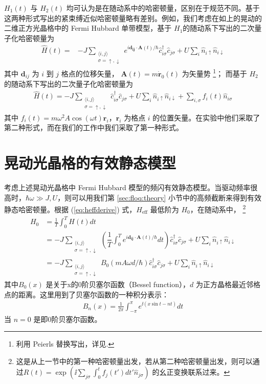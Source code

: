 $H_1(t)$ 与 $H_2(t)$ 均可认为是在随动系中的哈密顿量，区别在于规范不同。基于这两种形式写出的紧束缚近似哈密顿量略有差别。例如，我们考虑在如上的晃动的二维正方光晶格中的 Fermi Hubbard 单带模型，基于 $H_1$的随动系下写出的二次量子化哈密顿量为
\begin{align}
\hat{H}(t) =& -J \sum_{\substack{\langle i,j\rangle \\ \sigma = \uparrow,\downarrow}}e^{i\mathbf{d_{ij}}\cdot \mathbf{A}(t)/\hbar} \hat{c}_{i\sigma}^{\dagger}\hat{c}_{j\sigma}+U\sum_i\hat{n}_{i\uparrow}\hat{n}_{i\downarrow} \label{eq:ht1}
\end{align}
其中 $\mathbf{d}_{ij}$ 为 $i$ 到 $j$ 格点的位移矢量，
$\mathbf{A}(t) = m \dot{\mathbf{r}}_0(t)$ 为矢量势
\footnote{利用 Peierls 替换写出，详见.}；
而基于 $H_2$ 的随动系下写出的二次量子化哈密顿量为
\begin{align}\label{eq:floquet-Hubbard-1}
    \hat{H}(t)=- J \sum_{\substack{\langle i,j\rangle\\ \sigma=\uparrow,\downarrow}} \hat{c}_{i\sigma}^{\dagger}\hat{c}_{j\sigma}+U\sum_i\hat{n}_{i\uparrow}\hat{n}_{i\downarrow}+\sum_{i,\sigma}f_{i}(t)\hat{n}_{i\sigma}
\end{align} 
其中 $f_i(t)=m\omega^2A\cos(\omega t)\mathbf{r}_i$，$\mathbf{r}_i$ 为格点 $i$ 的位置矢量。在实验中他们采取了第二种形式，而在我们的工作中我们采取了第一种形式。






\section{晃动光晶格的有效静态模型}\label{sec:floq:heff}

考虑上述晃动光晶格中 Fermi Hubbard 模型的频闪有效静态模型。当驱动频率很高时，$\hbar\omega\gg J, U$，则可以用我们第 \ref{sec:floq:theory} 
小节中的高频截断来得到有效静态哈密顿量。根据 (\ref{eq:heffderive}) 式，$H_{\text{eff}}$ 最低阶为 $H_0$，在随动系中，
\footnote{这是从上一节中的第一种哈密顿量出发，若从第二种哈密顿量出发，则可以通过$R(t)=\exp(\ii\sum_{j\sigma}\int_0^tf_j(t')dt'\hat{n}_{j\sigma})$ 的幺正变换联系过来。}
\begin{align}
H_0 &= \frac{1}{T}\int_0^TH(t)dt \\
&= -J \sum_{\substack{\langle i,j\rangle \\ \sigma = \uparrow,\downarrow}} \left(\dfrac{1}{T}\int_0^Te^{i\mathbf{d_{ij}}\cdot \mathbf{A}(t)/\hbar}dt\right) \hat{c}_{i\sigma}^{\dagger}\hat{c}_{j\sigma}+U\sum_i\hat{n}_{i\uparrow}\hat{n}_{i\downarrow} \\
&= -J \sum_{\substack{\langle i,j\rangle \\ \sigma = \uparrow,\downarrow}} B_0(mA\omega d/\hbar) \hat{c}_{i\sigma}^{\dagger}\hat{c}_{j\sigma}+U\sum_i\hat{n}_{i\uparrow}\hat{n}_{i\downarrow}
\end{align}
其中$B_0(x)$ 是关于x的0阶贝塞尔函数（Bessel function），$d$ 为正方晶格最近邻格点的距离。这里用到了贝塞尔函数的一种积分表示：
\begin{align} \label{eq:bessel}
B_n(x) = \frac{1}{2\pi}\int_{-\pi}^{\pi} e^{\ii (x\sin t - nt)} dt
\end{align}
当 $n=0$ 是即0阶贝塞尔函数。

